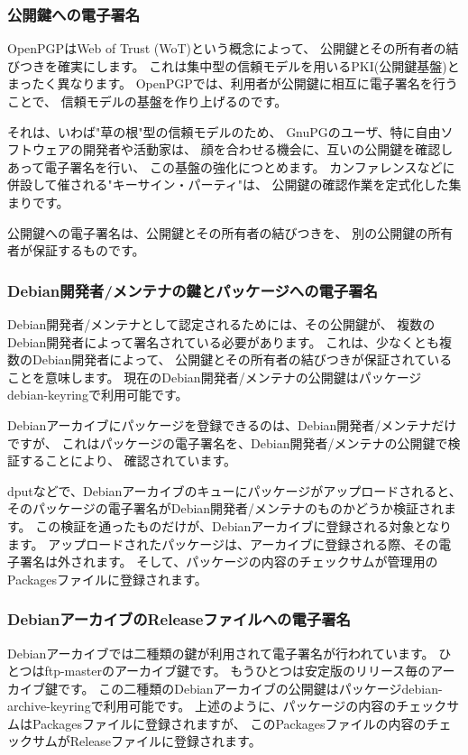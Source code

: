 \documentclass[mingoth,a4paper,twoside]{jsarticle}
\begin{document}
\subsubsection{公開鍵への電子署名}
OpenPGPはWeb of Trust (WoT)という概念によって、
公開鍵とその所有者の結びつきを確実にします。
これは集中型の信頼モデルを用いるPKI(公開鍵基盤)とまったく異なります。
OpenPGPでは、利用者が公開鍵に相互に電子署名を行うことで、
信頼モデルの基盤を作り上げるのです。

それは、いわば"草の根"型の信頼モデルのため、
GnuPGのユーザ、特に自由ソフトウェアの開発者や活動家は、
顔を合わせる機会に、互いの公開鍵を確認しあって電子署名を行い、
この基盤の強化につとめます。
カンファレンスなどに併設して催される"キーサイン・パーティ"は、
公開鍵の確認作業を定式化した集まりです。

公開鍵への電子署名は、公開鍵とその所有者の結びつきを、
別の公開鍵の所有者が保証するものです。


\subsubsection{Debian開発者/メンテナの鍵とパッケージへの電子署名}
Debian開発者/メンテナとして認定されるためには、その公開鍵が、
複数のDebian開発者によって署名されている必要があります。
これは、少なくとも複数のDebian開発者によって、
公開鍵とその所有者の結びつきが保証されていることを意味します。
%
現在のDebian開発者/メンテナの公開鍵はパッケージdebian-keyringで利用可能です。

Debianアーカイブにパッケージを登録できるのは、Debian開発者/メンテナだけですが、
これはパッケージの電子署名を、Debian開発者/メンテナの公開鍵で検証することにより、
確認されています。

dputなどで、Debianアーカイブのキューにパッケージがアップロードされると、
そのパッケージの電子署名がDebian開発者/メンテナのものかどうか検証されます。
この検証を通ったものだけが、Debianアーカイブに登録される対象となります。
%
アップロードされたパッケージは、アーカイブに登録される際、その電子署名は外されます。
そして、パッケージの内容のチェックサムが管理用のPackagesファイルに登録されます。


\subsubsection{DebianアーカイブのReleaseファイルへの電子署名}
Debianアーカイブでは二種類の鍵が利用されて電子署名が行われています。
ひとつはftp-masterのアーカイブ鍵です。
もうひとつは安定版のリリース毎のアーカイブ鍵です。
%
この二種類のDebianアーカイブの公開鍵はパッケージdebian-archive-keyringで利用可能です。
%
上述のように、パッケージの内容のチェックサムはPackagesファイルに登録されますが、
このPackagesファイルの内容のチェックサムがReleaseファイルに登録されます。
\end{document}
